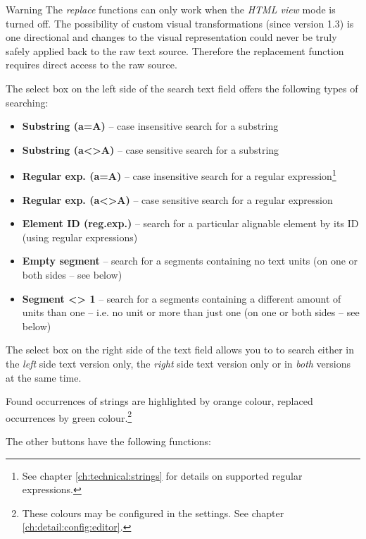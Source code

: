 \documentclass[a4paper,10pt,oneside]{book}
\begin{document}
\medskip
\begin{bclogo}[couleur = blue!30, arrondi = 0.1, logo = \bcattention,
ombre = true , epOmbre = 0.125, couleurOmbre = black!30, blur, epBord = 0.3, marge = 5]{Warning}\small
The \emph{replace} functions can only work when the \emph{HTML view} mode is turned off. The possibility of custom visual transformations (since version 1.3) is one directional and changes to the visual representation could never be truly safely applied back to the raw text source. Therefore the replacement function requires direct access to the raw source.
\end{bclogo}
\medskip

The select box on the left side of the search text field offers the following types of searching:

\begin{itemize}
 \item \textbf{Substring (a=A)} -- case insensitive search for a substring
 \item \textbf{Substring (a<>A)} -- case sensitive search for a substring
 \item \textbf{Regular exp. (a=A)} -- case insensitive search for a regular expression\footnote{See chapter \ref{ch:technical:strings} for details on supported regular expressions.}
 \item \textbf{Regular exp. (a<>A)} -- case sensitive search for a regular expression
 \item \textbf{Element ID (reg.exp.)} -- search for a particular alignable element by its ID (using regular expressions)
 \item \textbf{Empty segment} -- search for a segments containing no text units (on one or both sides -- see below)
 \item \textbf{Segment <> 1} -- search for a segments containing a different amount of units than one -- i.e. no unit or more than just one (on one or both sides -- see below)
\end{itemize}

The select box on the right side of the text field allows you to to search either in the \emph{left} side text version only, the \emph{right} side text version only or in \emph{both} versions at the same time.

Found occurrences of strings are highlighted by orange colour, replaced occurrences by green colour.\footnote{These colours may be configured in the settings. See chapter \ref{ch:detail:config:editor}.}

The other buttons have the following functions:
\end{document}
